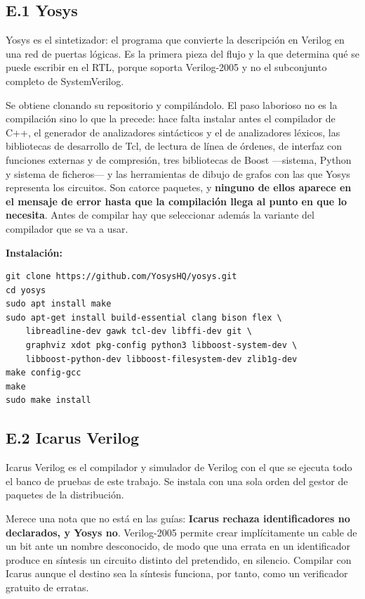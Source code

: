 \subsection{E.1 Yosys}\label{e.1-yosys}

Yosys es el sintetizador: el programa que convierte la descripción en
Verilog en una red de puertas lógicas. Es la primera pieza del flujo y
la que determina qué se puede escribir en el RTL, porque soporta
Verilog-2005 y no el subconjunto completo de SystemVerilog.

Se obtiene clonando su repositorio y compilándolo. El paso laborioso no
es la compilación sino lo que la precede: hace falta instalar antes el
compilador de C++, el generador de analizadores sintácticos y el de
analizadores léxicos, las bibliotecas de desarrollo de Tcl, de lectura
de línea de órdenes, de interfaz con funciones externas y de compresión,
tres bibliotecas de Boost ---sistema, Python y sistema de ficheros--- y
las herramientas de dibujo de grafos con las que Yosys representa los
circuitos. Son catorce paquetes, y \textbf{ninguno de ellos aparece en
el mensaje de error hasta que la compilación llega al punto en que lo
necesita}. Antes de compilar hay que seleccionar además la variante del
compilador que se va a usar.

\textbf{Instalación:}

\begin{verbatim}
git clone https://github.com/YosysHQ/yosys.git
cd yosys
sudo apt install make
sudo apt-get install build-essential clang bison flex \
    libreadline-dev gawk tcl-dev libffi-dev git \
    graphviz xdot pkg-config python3 libboost-system-dev \
    libboost-python-dev libboost-filesystem-dev zlib1g-dev
make config-gcc
make
sudo make install
\end{verbatim}

\subsection{E.2 Icarus Verilog}\label{e.2-icarus-verilog}

Icarus Verilog es el compilador y simulador de Verilog con el que se
ejecuta todo el banco de pruebas de este trabajo. Se instala con una
sola orden del gestor de paquetes de la distribución.

Merece una nota que no está en las guías: \textbf{Icarus rechaza
identificadores no declarados, y Yosys no}. Verilog-2005 permite crear
implícitamente un cable de un bit ante un nombre desconocido, de modo
que una errata en un identificador produce en síntesis un circuito
distinto del pretendido, en silencio. Compilar con Icarus aunque el
destino sea la síntesis funciona, por tanto, como un verificador
gratuito de erratas.

